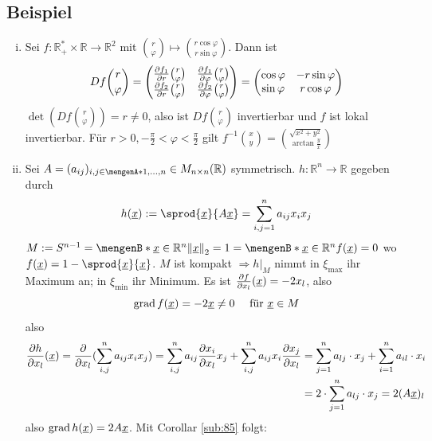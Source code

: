 \subsection{Beispiel} %
\label{sub:86}
\begin{enumerate}[(i)]
	\item Sei $f : \mathds{R}_+^* \times \mathds{R} \to \mathds{R}^2$ mit $\binom{r}{\varphi} \mapsto \binom{r \cos \varphi}{r \sin \varphi}  $. Dann ist
	\[
		D f \binom{r}{\varphi} = \begin{pmatrix}
			\frac{{\partial f_1}}{{\partial r}}  \binom{r}{\varphi}  & \frac{{\partial f_1}}{{\partial \varphi}}  \binom{r}{\varphi} \\
			\frac{{\partial f_2}}{{\partial r}}  \binom{r}{\varphi} & \frac{{\partial f_2}}{{\partial \varphi}}  \binom{r}{\varphi}     
		\end{pmatrix} = \begin{pmatrix}
			\cos \varphi & - r \sin \varphi \\
			\sin \varphi & r \cos \varphi
		\end{pmatrix}
	\]
	$\det (D f \binom{r}{\varphi} ) = r \not= 0$, also ist $D f \binom{r}{\varphi} $ invertierbar und $f$ ist lokal invertierbar. Für 
	$r>0, - \frac{\pi}{2} < \varphi < \frac{\pi}{2}$ gilt $f ^{-1} \binom{x}{y} = \binom{\sqrt{x^2+ y^2}}{\arctan \frac{y}{x} }    $
	\item Sei $A= (a_{ij})_{i,j \in \set{1, \ldots , n}}  \in M_{n\times n}(\mathds{R})$ symmetrisch. $h : \mathds{R}^n \to \mathds{R}$ gegeben durch
	\[
		h(\underline{x}) := \sprod{\underline{x}}{A \underline{x}} = \sum_{i,j =1}^{n} a_{ij} x_i x_j 
	\]
	$M:= S^{n-1} = \set[\underline{x} \in \mathds{R}^n]{ \norm[2]{\underline{x}} = 1 } = \set[\underline{x} \in \mathds{R}^n]{f(\underline{x})=0}  $ wo 
	$f(\underline{x}) = 1- \sprod{\underline{x}}{\underline{x}} $. $M$ ist kompakt $\Rightarrow h|_{M}$ nimmt in $\xi_{\max}$ ihr Maximum an; in $\xi_{\min}$ ihr Minimum.
	Es ist $\frac{{\partial f}}{{\partial x_l}}  (\underline{x})= - 2x_l $, also 
	\[
		\operatorname{grad} f(\underline{x}) = -2 \underline{x} \not= 0 \quad \text{ für } \underline{x} \in M
	\]
	also
	\begin{align*}
		\frac{{\partial h}}{{\partial x_l}} (\underline{x}) = \frac{{\partial }}{{\partial x_l}}  ( \sum_{i,j}^{n} a_{ij} x_i x_j ) = \sum_{i,j}^{n} a_{ij} \frac{{\partial x_i}}{{\partial x_l}}  x_j + \sum_{i,j}^{n} a_{ij} x_i \frac{{\partial x_j}}{{\partial x_l}}   
		&= \sum_{j=1}^{n} a_{lj} \cdot x_j + \sum_{i=1}^{n} a_{il} \cdot x_i \\
		&= 2 \cdot \sum_{j=1}^{n} a_{lj}\cdot  x_j = 2 (A \underline{x})_l
	\end{align*}  
	also $\operatorname{grad} h (\underline{x}) = 2 A \underline{x}$. Mit Corollar \ref{sub:85} folgt: 

\end{enumerate}
